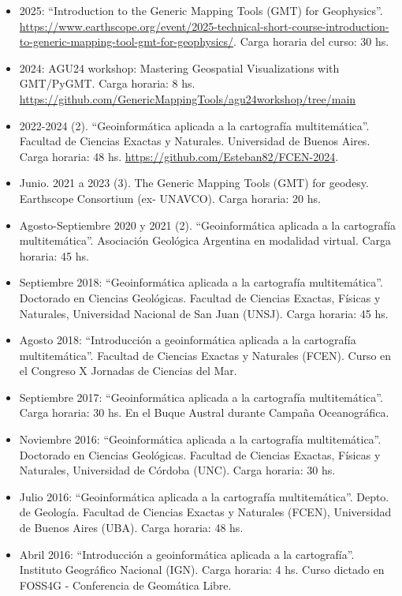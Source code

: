 \documentclass[11pt, a4paper]{article}
\begin{document}
\begin{itemize}
    \item 2025: “Introduction to the Generic Mapping Tools (GMT) for Geophysics”. \url{https://www.earthscope.org/event/2025-technical-short-course-introduction-to-generic-mapping-tool-gmt-for-geophysics/}. Carga horaria del curso: 30 hs.
    \item 2024: AGU24 workshop: Mastering Geospatial Visualizations with GMT/PyGMT. Carga horaria: 8 hs. \url{https://github.com/GenericMappingTools/agu24workshop/tree/main}
    \item 2022-2024 (2). “Geoinformática aplicada a la cartografía multitemática”. Facultad de Ciencias Exactas y Naturales. Universidad de Buenos Aires. Carga horaria: 48 hs. \url{https://github.com/Esteban82/FCEN-2024}.
    \item Junio. 2021 a 2023 (3). The Generic Mapping Tools (GMT) for geodesy. Earthscope Consortium (ex- UNAVCO). Carga horaria: 20 hs.
    \item Agosto-Septiembre 2020 y 2021 (2). “Geoinformática aplicada a la cartografía multitemática”. Asociación Geológica Argentina en modalidad virtual. Carga horaria: 45 hs.
    \item Septiembre 2018: “Geoinformática aplicada a la cartografía multitemática”. Doctorado en Ciencias Geológicas. Facultad de Ciencias Exactas, Físicas y Naturales, Universidad Nacional de San Juan (UNSJ). Carga horaria: 45 hs.
    \item Agosto 2018: “Introducción a geoinformática aplicada a la cartografía multitemática”. Facultad de Ciencias Exactas y Naturales (FCEN). Curso en el Congreso X Jornadas de Ciencias del Mar.
    \item Septiembre 2017: “Geoinformática aplicada a la cartografía multitemática”. Carga horaria: 30 hs. En el Buque Austral durante Campaña Oceanográfica.
    \item Noviembre 2016: “Geoinformática aplicada a la cartografía multitemática”. Doctorado en Ciencias Geológicas. Facultad de Ciencias Exactas, Físicas y Naturales, Universidad de Córdoba (UNC). Carga horaria: 30 hs.
    \item Julio 2016: “Geoinformática aplicada a la cartografía multitemática”. Depto. de Geología. Facultad de Ciencias Exactas y Naturales (FCEN), Universidad de Buenos Aires (UBA). Carga horaria: 48 hs.
    \item Abril 2016: “Introducción a geoinformática aplicada a la cartografía”. Instituto Geográfico Nacional (IGN). Carga horaria: 4 hs. Curso dictado en FOSS4G - Conferencia de Geomática Libre.
\end{itemize}
\end{document}
